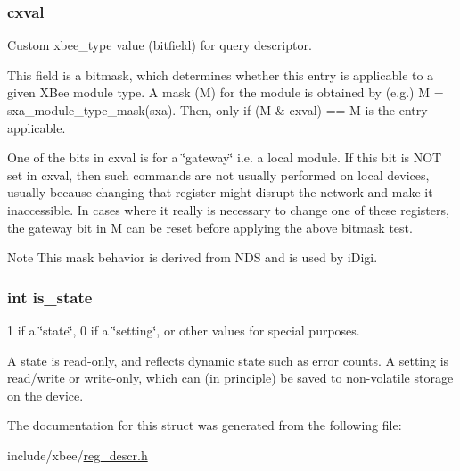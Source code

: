 \hypertarget{struct__xbee__reg__descr__t_aa89979f0cabc914d3df82120cb9aa1a4}{
\subsubsection[{cxval}]{ cxval}}\label{struct__xbee__reg__descr__t_aa89979f0cabc914d3df82120cb9aa1a4}


Custom xbee\-\_\-type value (bitfield) for query descriptor. 

This field is a bitmask, which determines whether this entry is applicable to a given X\-Bee module type. A mask (M) for the module is obtained by (e.\-g.) M = sxa\-\_\-module\-\_\-type\-\_\-mask(sxa). Then, only if (M \& cxval) == M is the entry applicable.

One of the bits in cxval is for a \char`\"{}gateway\char`\"{} i.\-e. a local module. If this bit is N\-O\-T set in cxval, then such commands are not usually performed on local devices, usually because changing that register might disrupt the network and make it inaccessible. In cases where it really is necessary to change one of these registers, the gateway bit in M can be reset before applying the above bitmask test.

\begin{DoxyNote}{Note}
This mask behavior is derived from N\-D\-S and is used by i\-Digi. 
\end{DoxyNote}
\hypertarget{struct__xbee__reg__descr__t_ad94e63af9aef7b2c583788852ebdc5b1}{
\subsubsection[{is\-\_\-state}]{\setlength{\rightskip}{0pt plus 5cm}int is\-\_\-state}}\label{struct__xbee__reg__descr__t_ad94e63af9aef7b2c583788852ebdc5b1}


1 if a \char`\"{}state\char`\"{}, 0 if a \char`\"{}setting\char`\"{}, or other values for special purposes. 

A state is read-\/only, and reflects dynamic state such as error counts. A setting is read/write or write-\/only, which can (in principle) be saved to non-\/volatile storage on the device. 

The documentation for this struct was generated from the following file\-:\begin{DoxyCompactItemize}
\item 
include/xbee/\hyperlink{reg__descr_8h}{reg\-\_\-descr.\-h}\end{DoxyCompactItemize}
